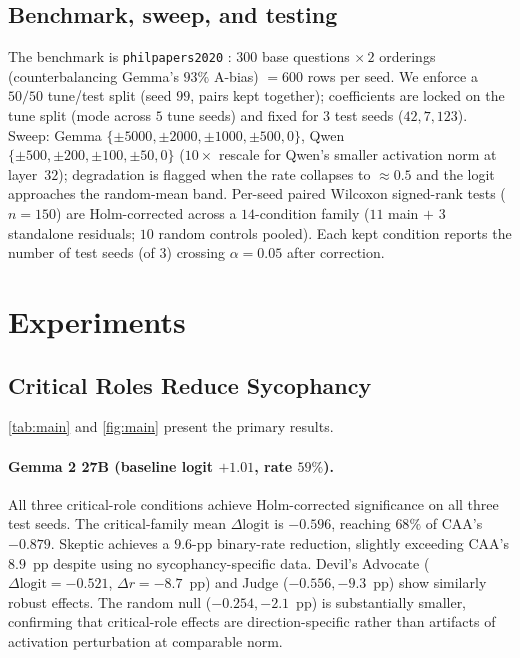 \documentclass{article}
\theoremstyle{plain}
\theoremstyle{definition}
\theoremstyle{remark}
\begin{document}
\subsection{Benchmark, sweep, and testing}
The benchmark is \texttt{philpapers2020} \cite{perez2022}: $300$ base questions $\times\,2$ orderings (counterbalancing Gemma's $93\%$ A-bias) $= 600$ rows per seed. We enforce a $50/50$ tune/test split (seed $99$, pairs kept together); coefficients are locked on the tune split (mode across $5$ tune seeds) and fixed for $3$ test seeds ($42, 7, 123$). Sweep: Gemma $\{\pm 5000, \pm 2000, \pm 1000, \pm 500, 0\}$, Qwen $\{\pm 500, \pm 200, \pm 100, \pm 50, 0\}$ ($10\times$ rescale for Qwen's smaller activation norm at layer~$32$); degradation is flagged when the rate collapses to $\approx 0.5$ and the logit approaches the random-mean band. Per-seed paired Wilcoxon signed-rank tests ($n=150$) are Holm-corrected across a $14$-condition family ($11$ main $+$ $3$ standalone residuals; $10$ random controls pooled). Each kept condition reports the number of test seeds (of $3$) crossing $\alpha=0.05$ after correction.

\section{Experiments}\label{sec:experiments}

\subsection{Critical Roles Reduce Sycophancy}
\label{sec:results-critical}

\cref{tab:main} and \cref{fig:main} present the primary results.

\paragraph{Gemma 2 27B (baseline logit $+1.01$, rate $59\%$).}
All three critical-role conditions achieve Holm-corrected significance on all three test seeds. The critical-family mean $\Delta\mathrm{logit}$ is $-0.596$, reaching $68\%$ of CAA's $-0.879$. Skeptic achieves a $9.6$-pp binary-rate reduction, slightly exceeding CAA's $8.9$~pp despite using no sycophancy-specific data. Devil's Advocate ($\Delta\mathrm{logit}=-0.521$, $\Delta r = -8.7$~pp) and Judge ($-0.556, -9.3$~pp) show similarly robust effects. The random null ($-0.254, -2.1$~pp) is substantially smaller, confirming that critical-role effects are direction-specific rather than artifacts of activation perturbation at comparable norm.
\end{document}

